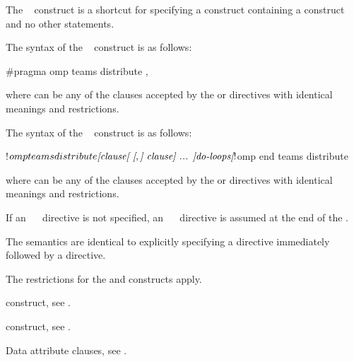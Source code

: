 \summary
The ~ construct is a shortcut for specifying 
a  construct containing a  construct and no 
other statements.

\syntax
\begin{ccppspecific}
The syntax of the ~ construct is as follows:

\begin{ompcPragma}
#pragma omp teams distribute \plc{[clause[ [},\plc{] clause] ... ] new-line}
\end{ompcPragma}

where  can be any of the clauses accepted by the  
or  directives with identical meanings and restrictions.
\end{ccppspecific}

\begin{fortranspecific}
The syntax of the ~ construct is as follows:

\begin{ompfPragma}
!$omp teams distribute \plc{[clause[ [},\plc{] clause] ... ]}
    \plc{do-loops}
\plc{[}!$omp end teams distribute\plc{]}
\end{ompfPragma}

where  can be any of the clauses accepted by the  
or  directives with identical meanings and restrictions.

If an ~~ directive is not specified, an
~~ directive is assumed at the end of 
the .
\end{fortranspecific}

\descr
The semantics are identical to explicitly specifying a  directive 
immediately followed by a  directive.

\restrictions
The restrictions for the  and  constructs apply.

\begin{crossrefs}
\item {} construct, see
.

\item {} construct, see
.

\item Data attribute clauses, see
.
\end{crossrefs}




